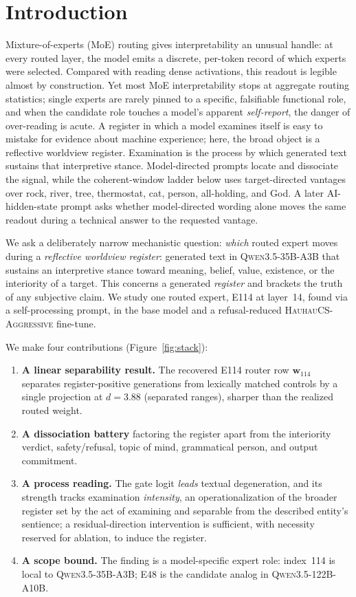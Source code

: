 \documentclass[10pt,a4paper,twocolumn]{article}
\newcommand{\wvec}{\mathbf{w}_{114}}
\begin{document}
\section{Introduction}

Mixture-of-experts (MoE) routing gives interpretability an unusual handle: at
every routed layer, the model emits a discrete, per-token record of which experts
were selected. Compared with reading dense activations, this readout is legible
almost by construction. Yet most MoE interpretability stops at aggregate routing
statistics; single experts are rarely pinned to a specific, falsifiable
functional role, and when the candidate role touches a model's apparent
\emph{self-report}, the danger of over-reading is acute. A register in which a
model examines itself is easy to mistake for evidence about machine experience;
here, the broad object is a reflective worldview register. Examination is the
process by which generated text sustains that interpretive stance. Model-directed
prompts locate and dissociate the signal, while the coherent-window ladder below
uses target-directed vantages over rock, river, tree, thermostat, cat, person,
all-holding, and God.
A later AI-hidden-state prompt asks whether model-directed wording alone moves
the same readout during a technical answer to the requested vantage.

We ask a deliberately narrow mechanistic question: \emph{which} routed expert
moves during a \emph{reflective worldview register}: generated text in
\textsc{Qwen3.5-35B-A3B} that sustains an interpretive stance toward meaning,
belief, value, existence, or the interiority of a target. This
concerns a generated \emph{register} and brackets the truth of any subjective
claim. We study one routed expert, E114 at layer~14, found via a self-processing
prompt, in the base model and a refusal-reduced \textsc{HauhauCS-Aggressive}
fine-tune.

We make four contributions (Figure~\ref{fig:stack}):
\begin{enumerate}[leftmargin=*,nosep]
\item \textbf{A linear separability result.} The recovered E114 router row
$\wvec$ separates register-positive generations from lexically matched controls
by a single projection at $d{=}3.88$ (separated ranges), sharper than the realized
routed weight.
\item \textbf{A dissociation battery} factoring the register apart from the
interiority verdict, safety/refusal, topic of mind, grammatical person, and
output commitment.
\item \textbf{A process reading.} The gate logit \emph{leads} textual
degeneration, and its strength tracks examination \emph{intensity}, an
operationalization of the broader register set by the act of examining and
separable from the described entity's sentience; a
residual-direction intervention is sufficient, with necessity reserved for ablation, to induce the
register.
\item \textbf{A scope bound.} The finding is a model-specific expert role:
index~114 is local to \textsc{Qwen3.5-35B-A3B}; E48 is the candidate analog in
\textsc{Qwen3.5-122B-A10B}.
\end{enumerate}
\end{document}
